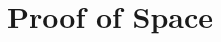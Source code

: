 \documentclass[../tb_report.tex]{subfiles}
\begin{document}
\chapter{Proof of Space}
\label{ch:intro}
\end{document}
